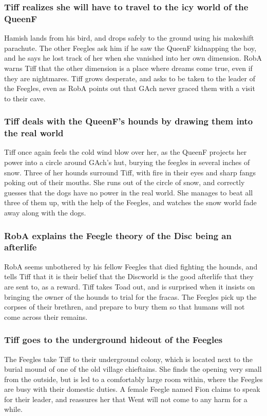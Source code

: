\subsubsection{\Gls{Tiff} realizes she will have to travel to the icy world of the \Gls{QueenF}}
\Gls{Hamish} lands from his bird, and drops safely to the ground using his makeshift parachute. The
other Feegles ask him if he saw the \Gls{QueenF} kidnapping the boy, and he says he lost track of
her when she vanished into her own dimension. \Gls{RobA} warns \Gls{Tiff} that the other dimension
is a place where dreams come true, even if they are nightmares. \Gls{Tiff} grows desperate, and
asks to be taken to the leader of the Feegles, even as \Gls{RobA} points out that \Gls{GAch} never
graced them with a visit to their cave.

\subsubsection{\Gls{Tiff} deals with the \Gls{QueenF}'s hounds by drawing them into the real world}
\Gls{Tiff} once again feels the cold wind blow over her, as the \Gls{QueenF} projects her power
into a circle around \Gls{GAch}'s hut, burying the feegles in several inches of snow. Three of her
hounds surround \Gls{Tiff}, with fire in their eyes and sharp fangs poking out of their mouths.
She runs out of the circle of snow, and correctly guesses that the dogs have no power in the
real world. She manages to beat all three of them up, with the help of the Feegles, and watches
the snow world fade away along with the dogs.

\subsubsection{\Gls{RobA} explains the Feegle theory of the Disc being an afterlife}
\Gls{RobA} seems unbothered by his fellow Feegles that died fighting the hounds, and tells
\Gls{Tiff} that it is their belief that the Discworld is the good afterlife that they are sent to,
as a reward. \Gls{Tiff} takes \Gls{Toad} out, and is surprised when it insists on bringing the
owner of the hounds to trial for the fracas. The Feegles pick up the corpses of their brethren, and
prepare to bury them so that humans will not come across their remains.

\subsubsection{\Gls{Tiff} goes to the underground hideout of the Feegles}
The Feegles take \Gls{Tiff} to their underground colony, which is located next to the burial mound
of one of the old village chieftains. She finds the opening very small from the outside, but is led
to a comfortably large room within, where the Feegles are busy with their domestic duties. A
female Feegle named \Gls{Fion} claims to speak for their leader, and reassures her that \Gls{Went}
will not come to any harm for a while.

